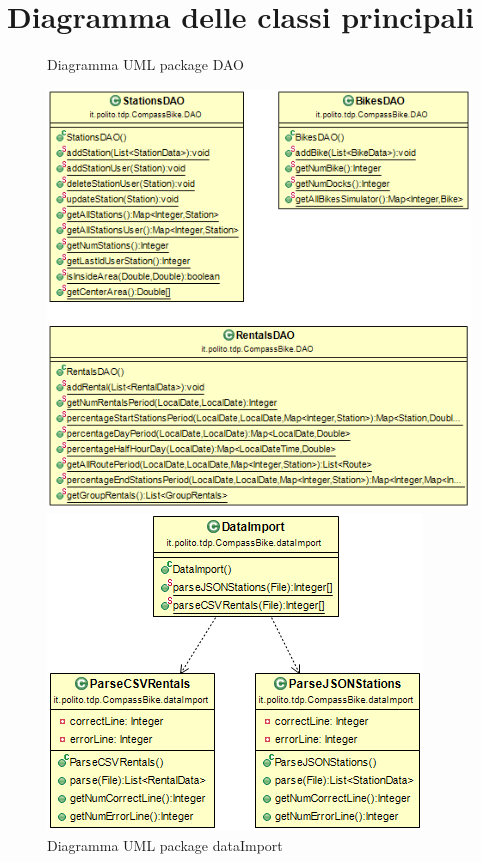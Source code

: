 \documentclass[a4paper, 12pt]{article}
\begin{document}
\section{Diagramma delle classi principali}
	\begin{figure}[H]
	\caption{Diagramma UML package DAO}
	\label{umldao}
	\hfill \includegraphics[height=0.45\textheight]{resources/images/UML/UMLDAO.png} \hspace*{\fill}
	\caption{Diagramma UML package dataImport}
	\label{umldata}
	\hfill \includegraphics[height=0.35\textheight]{resources/images/UML/UMLDataImport.png} \hspace*{\fill}
	\end{figure}	
\end{document}
